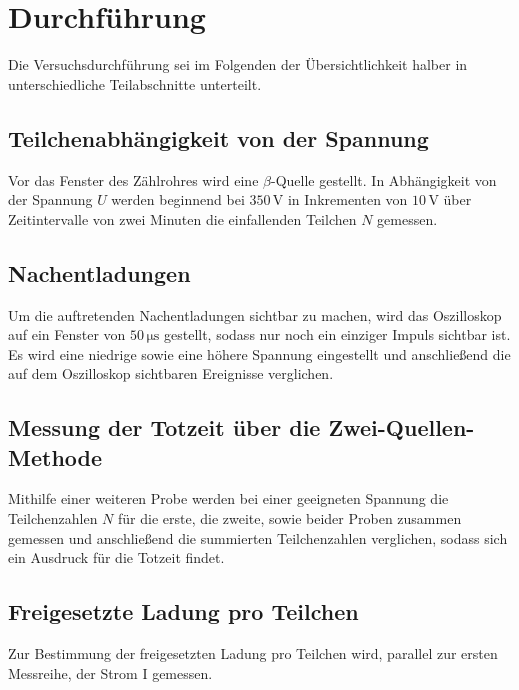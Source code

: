 \section{Durchführung}
\label{sec:Durchführung}

Die Versuchsdurchführung sei im Folgenden
der Übersichtlichkeit halber in unterschiedliche Teilabschnitte
unterteilt.

\subsection*{Teilchenabhängigkeit von der Spannung}

Vor das Fenster des Zählrohres wird eine $\beta$-Quelle gestellt.
In Abhängigkeit von der Spannung $U$ werden beginnend bei $350 \,\unit{\volt}$ in Inkrementen von $10 \,\unit{\volt}$
über Zeitintervalle von zwei Minuten die einfallenden Teilchen $N$ gemessen.

\subsection*{Nachentladungen}

Um die auftretenden Nachentladungen sichtbar zu machen, wird das Oszilloskop auf ein Fenster von $50 \,\unit{\micro\second}$
gestellt, sodass nur noch ein einziger Impuls sichtbar ist.
Es wird eine niedrige sowie eine höhere Spannung eingestellt und anschließend die auf dem Oszilloskop sichtbaren Ereignisse verglichen.

\subsection*{Messung der Totzeit über die Zwei-Quellen-Methode}

Mithilfe einer weiteren Probe werden bei einer geeigneten Spannung die Teilchenzahlen $N$ für die erste, die zweite, sowie
beider Proben zusammen gemessen und anschließend die summierten Teilchenzahlen verglichen, sodass sich ein
Ausdruck für die Totzeit findet.

\subsection*{Freigesetzte Ladung pro Teilchen}

Zur Bestimmung der freigesetzten Ladung pro Teilchen wird, parallel zur ersten Messreihe, der Strom I gemessen.
